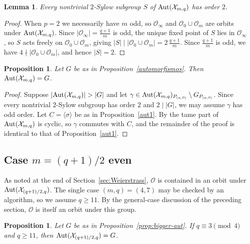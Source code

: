 \documentclass[12pt]{amsart}
\newtheorem{lemma}[theorem]{Lemma}
\newtheorem{proposition}[theorem]{Proposition}
\theoremstyle{remark}
\theoremstyle{definition}
\def\Aut{{\rm Aut}}
\begin{document}
\begin{lemma}
    Every nontrivial $2$-Sylow subgroup $S$ of $\Aut(\mathcal{X}_{m,q})$ has order $2$.
\end{lemma}

\begin{proof}
    When $p = 2$ we necessarily have $m$ odd, so $\mathcal{O}_\infty$ and 
    $\mathcal{O}_0 \cup \mathcal{O}_m$ are orbits under 
    $\Aut(\mathcal{X}_{m,q})$. Since $|\mathcal{O}_\infty| = \frac{q+1}{m}$ 
    is odd, the unique fixed point of $S$ lies in $\mathcal{O}_\infty$, so 
    $S$ acts freely on $\mathcal{O}_0 \cup \mathcal{O}_m$, giving 
    $|S| \mid |\mathcal{O}_0 \cup \mathcal{O}_m| = 2\,\frac{q+1}{m}$. 
    Since $\frac{q+1}{m}$ is odd, we have $4 \nmid |\mathcal{O}_0 \cup 
    \mathcal{O}_m|$, and hence $|S| = 2$.
\end{proof}

\begin{proposition}
    Let $G$ be as in Proposition~\ref{automorfismos}. Then 
    $\Aut(\mathcal{X}_{m,q}) = G$.
\end{proposition}

\begin{proof}
    Suppose $|\Aut(\mathcal{X}_{m,q})| > |G|$ and let 
    $\gamma \in \Aut(\mathcal{X}_{m,q})_{P_{(a,0)}} \setminus 
    G_{P_{(a,0)}}$. Since every nontrivial $2$-Sylow subgroup has order $2$ and 
    $2 \mid |G|$, we may assume $\gamma$ has odd order. Let 
    $C = \langle \sigma \rangle$ be as in Proposition~\ref{aut1}. By 
    \cite[Theorem~11.49]{HKT} the tame part of $\Aut(\mathcal{X}_{m,q})$ 
    is cyclic, so $\gamma$ commutes with $C$, and the remainder of the 
    proof is identical to that of Proposition~\ref{aut1}.
\end{proof}


\subsection{\texorpdfstring{Case $m = (q+1)/2$ even}
    {Case m = (q+1)/2 even}}

As noted at the end of Section~\ref{sec:Weierstrass}, $\mathcal{O}$ is 
contained in an orbit under $\Aut(\mathcal{X}_{(q+1)/2,q})$. The single case 
$(m, q) = (4, 7)$ may be checked by an algorithm, so we assume $q \ge 11$. By the 
general-case discussion of the preceding section, $\mathcal{O}$ is itself 
an orbit under this group.

\begin{proposition}
    Let $G$ be as in Proposition~\ref{prop:bigger-aut}. If 
    $q \equiv 3 \pmod{4}$ and $q \ge 11$, then 
    $\Aut(\mathcal{X}_{(q+1)/2,q}) = G$.
\end{proposition}
\end{document}
